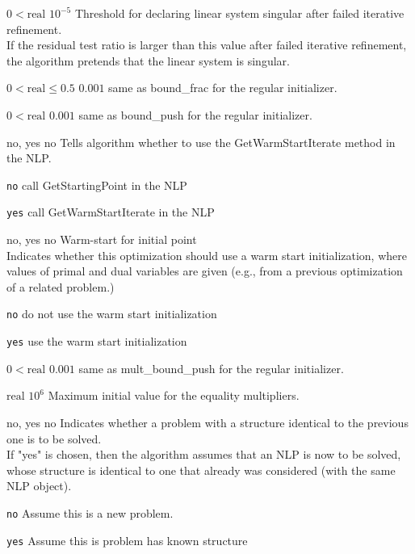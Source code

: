 %
{$0<\textrm{real}$}%
{$10^{- 5}$}%
{Threshold for declaring linear system singular after failed iterative refinement.\\
If the residual test ratio is larger than this value after failed iterative refinement, the algorithm pretends that the linear system is singular.}%
{}

%
{$0<\textrm{real}\leq0.5$}%
{$0.001$}%
{same as bound\_frac for the regular initializer.}%
{}

%
{$0<\textrm{real}$}%
{$0.001$}%
{same as bound\_push for the regular initializer.}%
{}

%
{no, yes}%
{no}%
{Tells algorithm whether to use the GetWarmStartIterate method in the NLP.}%
{\begin{list}{}{
\setlength{\parsep}{0em}
\setlength{\leftmargin}{5ex}
\setlength{\labelwidth}{2ex}
\setlength{\itemindent}{0ex}
\setlength{\topsep}{0pt}}
\item[\texttt{no}] call GetStartingPoint in the NLP
\item[\texttt{yes}] call GetWarmStartIterate in the NLP
\end{list}
}

%
{no, yes}%
{no}%
{Warm-start for initial point\\
Indicates whether this optimization should use a warm start initialization, where values of primal and dual variables are given (e.g., from a previous optimization of a related problem.)}%
{\begin{list}{}{
\setlength{\parsep}{0em}
\setlength{\leftmargin}{5ex}
\setlength{\labelwidth}{2ex}
\setlength{\itemindent}{0ex}
\setlength{\topsep}{0pt}}
\item[\texttt{no}] do not use the warm start initialization
\item[\texttt{yes}] use the warm start initialization
\end{list}
}

%
{$0<\textrm{real}$}%
{$0.001$}%
{same as mult\_bound\_push for the regular initializer.}%
{}

%
{$\textrm{real}$}%
{$10^{  6}$}%
{Maximum initial value for the equality multipliers.}%
{}

%
{no, yes}%
{no}%
{Indicates whether a problem with a structure identical to the previous one is to be solved.\\
If "yes" is chosen, then the algorithm assumes that an NLP is now to be solved, whose structure is identical to one that already was considered (with the same NLP object).}%
{\begin{list}{}{
\setlength{\parsep}{0em}
\setlength{\leftmargin}{5ex}
\setlength{\labelwidth}{2ex}
\setlength{\itemindent}{0ex}
\setlength{\topsep}{0pt}}
\item[\texttt{no}] Assume this is a new problem.
\item[\texttt{yes}] Assume this is problem has known structure
\end{list}
}

